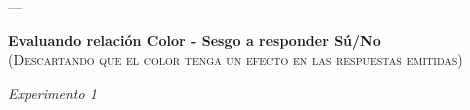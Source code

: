 \documentclass[a4paper ]{article}
\begin{document}
\clearpage

















---
\vspace{3mm}
\begin{center}
{\LARGE \textbf{Evaluando relación Color - Sesgo a responder Sú/No}}\\
{\small \textsc{(Descartando que el color tenga un efecto en las respuestas emitidas)}}\\
\smallskip
\end{center}
\begin{center}
{\LARGE \textit{Experimento 1}}\\
\end{center}
\vspace{3mm}
\end{document}
